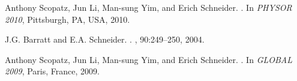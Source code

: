 \documentclass[preprint,12pt]{elsarticle}
\begin{document}
\begin{thebibliography}{99}
Anthony Scopatz, Jun Li, Man-sung Yim, and Erich Schneider.
.
\newblock In {\em PHYSOR 2010}, Pittsburgh, PA, USA, 2010.

J.G. Barratt and E.A. Schneider.
.
, 90:249--250, 2004.

Anthony Scopatz, Jun Li, Man-sung Yim, and Erich Schneider.
.
\newblock In {\em GLOBAL 2009}, Paris, France, 2009.

\end{thebibliography}
\end{document}
